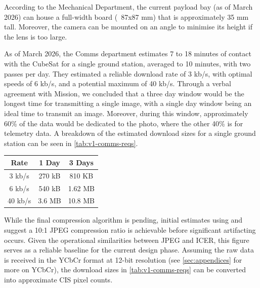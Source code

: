 \label{sec:v1-capabilities-mech}
According to the Mechanical Department, the current payload bay (as of March 2026) can house a full-width board (~87x87 mm) that is approximately 35 mm tall.
Moreover, the camera can be mounted on an angle to minimise its height if the lens is too large.

\label{sec:v1-capabilities-comms}
As of March 2026, the Comms department estimates 7 to 18 minutes of contact with the CubeSat for a single ground station, averaged to 10 minutes, with two passes per day.
They estimated a reliable download rate of 3 kb/s, with optimal speeds of 6 kb/s, and a potential maximum of 40 kb/s.
Through a verbal agreement with Mission, we concluded that a three day window would be the longest time for transmitting a single image, with a single day window being an ideal time to transmit an image.
Moreover, during this window, approximately 60\% of the data would be dedicated to the photo, where the other 40\% is for telemetry data.
A breakdown of the estimated download sizes for a single ground station can be seen in \autoref{tab:v1-comms-reqs}.

\begin{indentedfigure}
    \centering
    \begin{tabular}{|c|c|c|}
        \hline
        \textbf{Rate} & \textbf{1 Day} & \textbf{3 Days} \\
        \hline
        3 kb/s & 270 kB & 810 KB \\
        \hline
        6 kb/s & 540 kB & 1.62 MB \\
        \hline
        40 kb/s & 3.6 MB & 10.8 MB \\
        \hline
    \end{tabular}
    \caption{Estimated download sizes for a single ground station at 60\% usage}
    \label{tab:v1-comms-reqs}
\end{indentedfigure}

While the final compression algorithm is pending, initial estimates using \cite{balalam_image_compression} and \cite{squoosh_editor} suggest a 10:1 JPEG compression ratio is achievable before significant artifacting occurs.
Given the operational similarities between JPEG and ICER, this figure serves as a reliable baseline for the current design phase.
Assuming the raw data is received in the YCbCr format at 12-bit resolution (see \autoref{sec:appendices} for more on YCbCr), the download sizes in \autoref{tab:v1-comms-reqs} can be converted into approximate CIS pixel counts.

